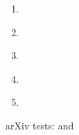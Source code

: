 \documentclass{article}
\begin{document}
\begin{enumerate}
  \item \autocite[10]{Hemingway1940}
  \item \autocites{Hemingway1940}{JiM2020}
  \item \autocites[10]{JiM2020}[20]{Hemingway1940}
  \item \autocites[10]{Hemingway1940}{JiM2020}
  \item \autocites{Hemingway1940}[20]{JiM2020}
\end{enumerate}

arXiv tests: \textcite{0801.1144} and \textcite{wilcox.e:2021}
\end{document}
